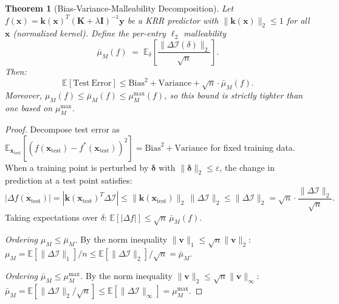 \documentclass{article}
\theoremstyle{plain}
\newtheorem{theorem}{Theorem}[section]
\theoremstyle{definition}
\theoremstyle{remark}
\newcommand{\E}{\mathbb{E}}
\begin{document}
\begin{theorem}[Bias-Variance-Malleability Decomposition]
\label{thm:bvm_decomp}
Let $f(\mathbf{x}) = \mathbf{k}(\mathbf{x})^T(\mathbf{K}+\lambda\mathbf{I})^{-1}\mathbf{y}$ be a KRR predictor with $\|\mathbf{k}(\mathbf{x})\|_2 \leq 1$ for all $\mathbf{x}$ (normalized kernel). Define the \emph{per-entry $\ell_2$ malleability}
$$\bar{\mu}_M(f) \;=\; \E_\delta\!\left[\frac{\|\Delta\boldsymbol{\mathcal{I}}(\delta)\|_2}{\sqrt{n}}\right].$$
Then:
$$\E[\mathrm{Test~Error}] \leq \mathrm{Bias}^2 + \mathrm{Variance} + \sqrt{n}\cdot\bar{\mu}_M(f).$$
Moreover, $\mu_M(f) \leq \bar{\mu}_M(f) \leq \mu_M^{\max}(f)$, so this bound is strictly tighter than one based on $\mu_M^{\max}$.
\end{theorem}

\begin{proof}
Decompose test error as $\E_{\mathbf{x}_{\mathrm{test}}}[(f(\mathbf{x}_{\mathrm{test}}) - f^*(\mathbf{x}_{\mathrm{test}}))^2] = \mathrm{Bias}^2 + \mathrm{Variance}$ for fixed training data. When a training point is perturbed by $\boldsymbol{\delta}$ with $\|\boldsymbol{\delta}\|_2 \leq \varepsilon$, the change in prediction at a test point satisfies:
$$|\Delta f(\mathbf{x}_{\mathrm{test}})| = |\mathbf{k}(\mathbf{x}_{\mathrm{test}})^T \Delta\boldsymbol{\mathcal{I}}| \leq \|\mathbf{k}(\mathbf{x}_{\mathrm{test}})\|_2\,\|\Delta\boldsymbol{\mathcal{I}}\|_2 \leq \|\Delta\boldsymbol{\mathcal{I}}\|_2 = \sqrt{n}\cdot\frac{\|\Delta\boldsymbol{\mathcal{I}}\|_2}{\sqrt{n}}.$$
Taking expectations over $\delta$: $\E[|\Delta f|] \leq \sqrt{n}\,\bar{\mu}_M(f)$.

\emph{Ordering $\mu_M \leq \bar{\mu}_M$.} By the norm inequality $\|\mathbf{v}\|_1 \leq \sqrt{n}\|\mathbf{v}\|_2$: $\mu_M = \E[\|\Delta\boldsymbol{\mathcal{I}}\|_1]/n \leq \E[\|\Delta\boldsymbol{\mathcal{I}}\|_2]/\sqrt{n} = \bar{\mu}_M$.

\emph{Ordering $\bar{\mu}_M \leq \mu_M^{\max}$.} By the norm inequality $\|\mathbf{v}\|_2 \leq \sqrt{n}\|\mathbf{v}\|_\infty$: $\bar{\mu}_M = \E[\|\Delta\boldsymbol{\mathcal{I}}\|_2/\sqrt{n}] \leq \E[\|\Delta\boldsymbol{\mathcal{I}}\|_\infty] = \mu_M^{\max}$.
\end{proof}
\end{document}
